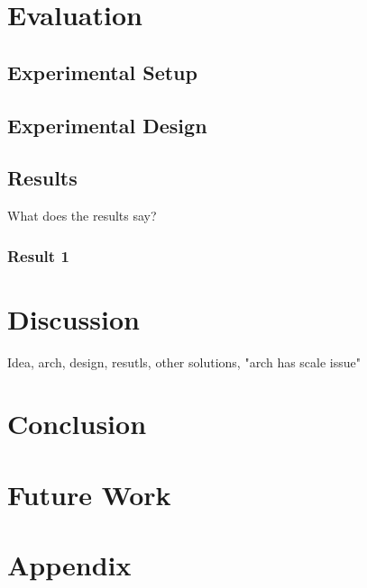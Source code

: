 \documentclass[USenglish]{uit-thesis}
\begin{document}
\chapter{Evaluation}
\section{Experimental Setup}
\section{Experimental Design}
\section{Results}
What does the results say?
\subsection{Result 1}


\chapter{Discussion}
Idea, arch, design, resutls, other solutions, "arch has scale issue"

\chapter{Conclusion}

\chapter{Future Work}

\chapter{Appendix}


\backmatter


\newpage{}

\begin{thebibliography}{9}

\end{thebibliography}
\end{document}
